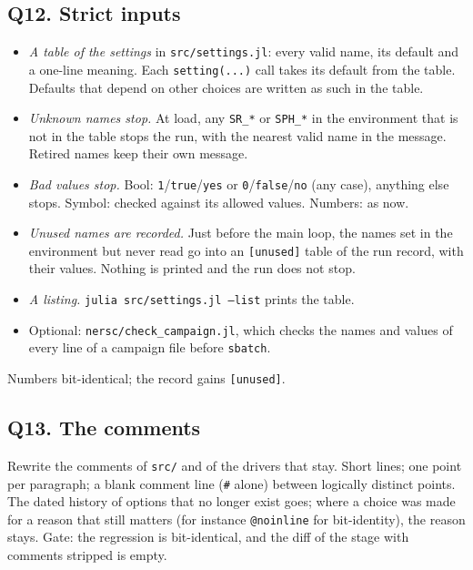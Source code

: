 \documentclass[11pt,aps,preprint,nofootinbib,superscriptaddress,tightenlines]{revtex4-2}
\begin{document}
\subsection*{Q12. Strict inputs}
\begin{itemize}
\item \emph{A table of the settings} in \nolinkurl{src/settings.jl}: every valid name, its default and a one-line meaning.  Each
  \texttt{setting(...)} call takes its default from the table.  Defaults that depend on other choices are written as such in the table.
\item \emph{Unknown names stop.}  At load, any \texttt{SR\_*} or \texttt{SPH\_*} in the environment that is not in the table stops the run, with
  the nearest valid name in the message.  Retired names keep their own message.
\item \emph{Bad values stop.}  Bool: \texttt{1}/\texttt{true}/\texttt{yes} or \texttt{0}/\texttt{false}/\texttt{no} (any case), anything else
  stops.  Symbol: checked against its allowed values.  Numbers: as now.
\item \emph{Unused names are recorded.}  Just before the main loop, the names set in the environment but never read go into an
  \texttt{[unused]} table of the run record, with their values.  Nothing is printed and the run does not stop.
\item \emph{A listing.}  \texttt{julia src/settings.jl --list} prints the table.
\item Optional: \nolinkurl{nersc/check_campaign.jl}, which checks the names and values of every line of a campaign file before \texttt{sbatch}.
\end{itemize}
Numbers bit-identical; the record gains \texttt{[unused]}.

\subsection*{Q13. The comments}
Rewrite the comments of \nolinkurl{src/} and of the drivers that stay.  Short lines; one point per paragraph; a blank comment line (\texttt{\#}
alone) between logically distinct points.  The dated history of options that no longer exist goes; where a choice was made for a reason that
still matters (for instance \texttt{@noinline} for bit-identity), the reason stays.  Gate: the regression is bit-identical, and the diff of the
stage with comments stripped is empty.
\end{document}
